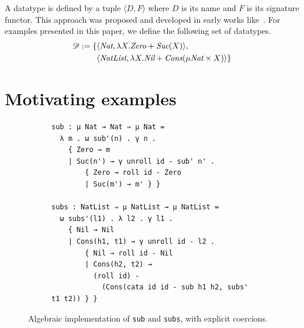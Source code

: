 \documentclass[pdflatex,sn-mathphys-num]{sn-jnl}%
\theoremstyle{thmstyleone}%
\theoremstyle{thmstyletwo}%
\theoremstyle{thmstylethree}%
\begin{document}
%


A datatype is defined by a tuple $\langle D , F \rangle$ where $D$ is
its name and $F$ is its signature functor.  This approach was proposed
and developed in early works like~\cite{hagino87,goguen+77}.  For
examples presented in this paper, we define the following set of
datatypes.
\begin{align*}
  \mathscr{D} := \{
    & \langle \textit{Nat} , \lambda X . \textit{Zero} + \textit{Suc}(X) \rangle, \\
    & \langle \textit{NatList}, \lambda X . \textit{Nil} + \textit{Cons}(\mu \textit{Nat} \times X) \rangle
  \}
\end{align*}

\section{Motivating examples}
\label{sec:motivating-examples}

\begin{figure}[tb]
  \centering

  \begin{subfigure}[t]{1.0\textwidth}
  \begin{verbatim}
sub : μ Nat → Nat ⇒ μ Nat =
  λ m . ω sub'(n) . γ n .
    { Zero → m
    | Suc(n') → γ unroll id - sub' n' .
        { Zero → roll id - Zero
        | Suc(m') → m' } }

subs : NatList ⇒ μ NatList → μ NatList =
  ω subs'(l1) . λ l2 . γ l1 .
    { Nil → Nil
    | Cons(h1, t1) → γ unroll id - l2 .
        { Nil → roll id - Nil
        | Cons(h2, t2) →
          (roll id) -
            (Cons(cata id id - sub h1 h2, subs' t1 t2)) } }
  \end{verbatim}
  \end{subfigure}
  \caption{Algebraic implementation of \texttt{sub} and \texttt{subs}, with explicit coercions. }
  \label{fig:example-subs-algebraic-with-coercions}
\end{figure}
\end{document}
